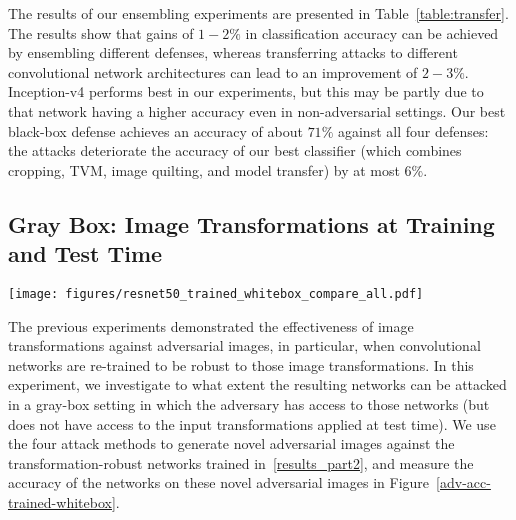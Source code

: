 The results of our ensembling experiments are presented in Table~\ref{table:transfer}. The results show that gains of $1 \!-\! 2\%$ in classification accuracy can be achieved by ensembling different defenses, whereas transferring attacks to different convolutional network architectures can lead to an improvement of $2 \!-\! 3\%$. Inception-v4 performs best in our experiments, but this may be partly due to that network having a higher accuracy even in non-adversarial settings. Our best black-box defense achieves an accuracy of about $71\%$ against all four defenses: the attacks deteriorate the accuracy of our best classifier (which combines cropping, TVM, image quilting, and model transfer) by at most $6\%$.

\subsection{Gray Box: Image Transformations at Training and Test Time}
\label{results_part4}

\begin{figure*}[t!]
    \centering
    \texttt{[image: figures/resnet50\_trained\_whitebox\_compare\_all.pdf]}
    \caption{Top-1 classification accuracy of ResNet-50 \emph{trained and tested} on transformed adversarial images produced by four attacks using five image transformations \emph{in a gray-box setting}: (1) cropping-rescaling, (2) bit-depth reduction, (3) JPEG compression, (4) total variance minimization, and (5) image quilting. The dotted line represents the top-1 accuracy of the ResNet-50 model on non-adversarial images, providing an upper bound on the effectiveness of a defense. $L_2$-dissimilarity of 0 corresponds to clean image accuracy. Higher is better.}\label{adv-acc-trained-whitebox}
\end{figure*}

The previous experiments demonstrated the effectiveness of image transformations against adversarial images, in particular, when convolutional networks are re-trained to be robust to those image transformations. In this experiment, we investigate to what extent the resulting networks can be attacked in a gray-box setting in which the adversary has access to those networks (but does not have access to the input transformations applied at test time). We use the four attack methods to generate novel adversarial images against the transformation-robust networks trained in~\ref{results_part2}, and measure the accuracy of the networks on these novel adversarial images in Figure~\ref{adv-acc-trained-whitebox}.


